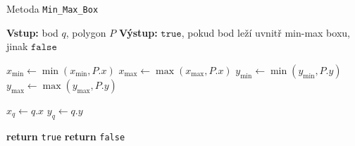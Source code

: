\begin{algorithm}
    \caption{Metoda \texttt{Min\_Max\_Box}}
    \begin{algorithmic}[1]
        \STATE \textbf{Vstup:} bod $q$, polygon $P$
        \STATE \textbf{Výstup:} $\texttt{true}$, pokud bod leží uvnitř min-max boxu, jinak $\texttt{false}$

        \STATE $x_{\min} \gets \min(x_{\min}, P.x)$
        \STATE $x_{\max} \gets \max(x_{\max}, P.x)$
        \STATE $y_{\min} \gets \min(y_{\min}, P.y)$
        \STATE $y_{\max} \gets \max(y_{\max}, P.y)$
        
        \STATE $x_q \gets q.x$
        \STATE $y_q \gets q.y$
        
            \STATE \textbf{return} \texttt{true} 
        \ELSE
            \STATE \textbf{return} \texttt{false} 
        \ENDIF
    \end{algorithmic}
\end{algorithm}
